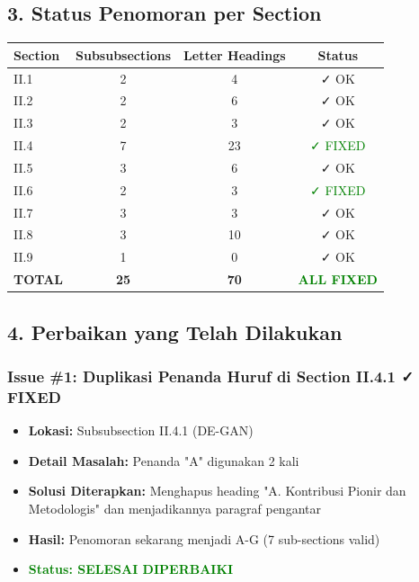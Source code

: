\documentclass[11pt,a4paper]{article}
\begin{document}
\subsection*{3. Status Penomoran per Section}

\begin{table}[h]
\centering
\begin{tabular}{|l|c|c|c|}
\hline
\textbf{Section} & \textbf{Subsubsections} & \textbf{Letter Headings} & \textbf{Status} \\
\hline
II.1 & 2 & 4 & ✓ OK \\
II.2 & 2 & 6 & ✓ OK \\
II.3 & 2 & 3 & ✓ OK \\
II.4 & 7 & 23 & \textcolor{green}{✓ FIXED} \\
II.5 & 3 & 6 & ✓ OK \\
II.6 & 2 & 3 & \textcolor{green}{✓ FIXED} \\
II.7 & 3 & 3 & ✓ OK \\
II.8 & 3 & 10 & ✓ OK \\
II.9 & 1 & 0 & ✓ OK \\
\hline
\textbf{TOTAL} & \textbf{25} & \textbf{70} & \textcolor{green}{\textbf{ALL FIXED}} \\
\hline
\end{tabular}
\end{table}

\subsection*{4. Perbaikan yang Telah Dilakukan}

\subsubsection*{Issue \#1: Duplikasi Penanda Huruf di Section II.4.1 ✓ FIXED}
\begin{itemize}[leftmargin=*]
    \item \textbf{Lokasi:} Subsubsection II.4.1 (DE-GAN)
    \item \textbf{Detail Masalah:} Penanda "A" digunakan 2 kali
    \item \textbf{Solusi Diterapkan:} Menghapus heading "A. Kontribusi Pionir dan Metodologis" dan menjadikannya paragraf pengantar
    \item \textbf{Hasil:} Penomoran sekarang menjadi A-G (7 sub-sections valid)
    \item \textcolor{green}{\textbf{Status: SELESAI DIPERBAIKI}}
\end{itemize}
\end{document}
